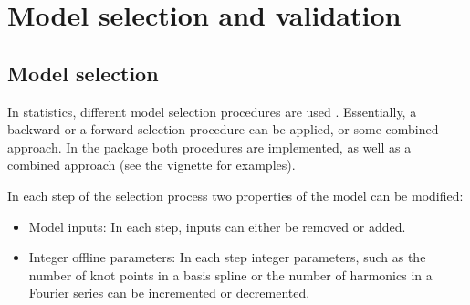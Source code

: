 






\section{Model selection and validation} \label{sec:model-select-valid}

\subsection{Model selection}

In statistics, different model selection procedures are used
\citep{madsen2010introduction}. Essentially, a backward or a forward selection
procedure can be applied, or some combined approach. In the \onlineforecast
package both procedures are implemented, as well as a combined
approach (see the
   vignette for examples).

In each step of the selection process two properties of the model can be modified:
\begin{itemize}
\item Model inputs: In each step, inputs can either be removed or added.
\item Integer offline parameters: In each step integer parameters, such
  as the number of knot points in a basis spline or the number of harmonics in a
  Fourier series can be incremented or decremented.
\end{itemize}

